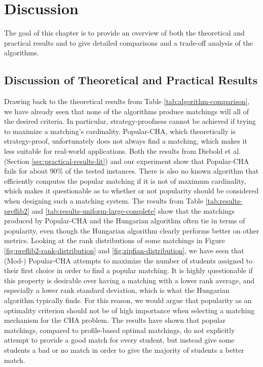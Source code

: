 \section{Discussion}

The goal of this chapter is to provide an overview of both the theoretical and practical results and to give detailed comparisons and a trade-off analysis of the algorithms.

\subsection{Discussion of Theoretical and Practical Results}
Drawing back to the theoretical results from Table \ref{tab:algorithm-comparison}, we have already seen that none of the algorithms produce matchings will all of the desired criteria. In particular, strategy-proofness cannot be achieved if trying to maximize a matching's cardinality. Popular-CHA, which theoretically is strategy-proof, unfortunately does not always find a matching, which makes it less suitable for real-world applications. Both the results from Diebold et al. (Section \ref{sec:practical-results-lit}) and our experiment show that Popular-CHA fails for about 90\% of the tested instances. There is also no known algorithm that efficiently computes the popular matching if it is not of maximum cardinality, which makes it questionable as to whether or not popularity should be considered when designing such a matching system. The results from Table \ref{tab:results-preflib2} and \ref{tab:results-uniform-large-complete} show that the matchings produced by Popular-CHA and the Hungarian algorithm often tie in terms of popularity, even though the Hungarian algorithm clearly performs better on other metrics. Looking at the rank distributions of some matchings in Figure \ref{fig:preflib2-rank-distribution} and \ref{fig:zipfian-distribution}, we have seen that (Mod-) Popular-CHA attempts to maximize the number of students assigned to their first choice in order to find a popular matching. It is highly questionable if this property is desirable over having a matching with a lower rank average, and especially a lower rank standard deviation, which is what the Hungarian algorithm typically finds. For this reason, we would argue that popularity as an optimality criterion should not be of high importance when selecting a matching mechanism for the CHA problem. The results have shown that popular matchings, compared to profile-based optimal matchings, do not explicitly attempt to provide a good match for every student, but instead give some students a bad or no match in order to give the majority of students a better match.

